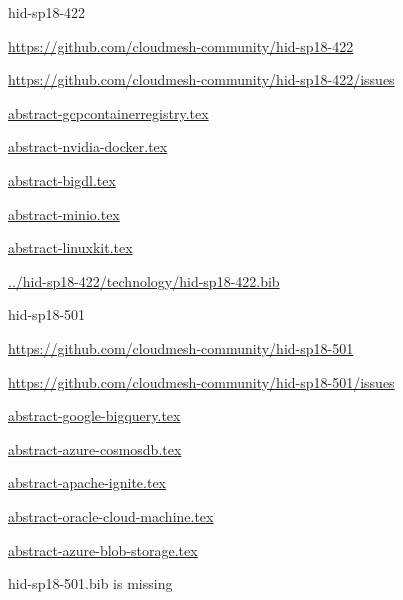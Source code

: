 \begin{IU}

hid-sp18-422

\url{https://github.com/cloudmesh-community/hid-sp18-422}

\url{https://github.com/cloudmesh-community/hid-sp18-422/issues}

\href{https://github.com/cloudmesh-community/hid-sp18-422/blob/master//technology/abstract-gcpcontainerregistry.tex}{abstract-gcpcontainerregistry.tex}

\href{https://github.com/cloudmesh-community/hid-sp18-422/blob/master//technology/abstract-nvidia-docker.tex}{abstract-nvidia-docker.tex}

\href{https://github.com/cloudmesh-community/hid-sp18-422/blob/master//technology/abstract-bigdl.tex}{abstract-bigdl.tex}

\href{https://github.com/cloudmesh-community/hid-sp18-422/blob/master//technology/abstract-minio.tex}{abstract-minio.tex}

\href{https://github.com/cloudmesh-community/hid-sp18-422/blob/master//technology/abstract-linuxkit.tex}{abstract-linuxkit.tex}

\href{https://github.com/cloudmesh-community/hid-sp18-422/blob/master//technology/hid-sp18-422.bib}{../hid-sp18-422/technology/hid-sp18-422.bib}

\end{IU}


\begin{IU}

hid-sp18-501

\url{https://github.com/cloudmesh-community/hid-sp18-501}

\url{https://github.com/cloudmesh-community/hid-sp18-501/issues}

\href{https://github.com/cloudmesh-community/hid-sp18-501/blob/master//technology/abstract-google-bigquery.tex}{abstract-google-bigquery.tex}

\href{https://github.com/cloudmesh-community/hid-sp18-501/blob/master//technology/abstract-azure-cosmosdb.tex}{abstract-azure-cosmosdb.tex}

\href{https://github.com/cloudmesh-community/hid-sp18-501/blob/master//technology/abstract-apache-ignite.tex}{abstract-apache-ignite.tex}

\href{https://github.com/cloudmesh-community/hid-sp18-501/blob/master//technology/abstract-oracle-cloud-machine.tex}{abstract-oracle-cloud-machine.tex}

\href{https://github.com/cloudmesh-community/hid-sp18-501/blob/master//technology/abstract-azure-blob-storage.tex}{abstract-azure-blob-storage.tex}

hid-sp18-501.bib is missing

\end{IU}


